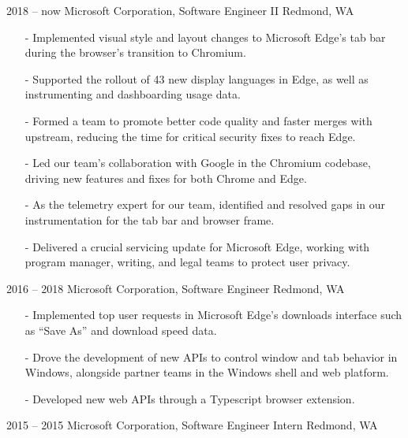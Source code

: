 \documentclass[print]{template/friggeri-cv}
\begin{document}
    \begin{entrylist}
        \entry
            {2018 -- now}
            {Microsoft Corporation, {\normalfont Software Engineer II}}
            {Redmond, WA}
            {\vspace{6pt} \begin{itemize}[leftmargin=*,itemsep=4pt]
                \item[-] Implemented visual style and layout changes to Microsoft Edge's tab bar during the browser's transition to Chromium.
                \item[-] Supported the rollout of 43 new display languages in Edge, as well as instrumenting and dashboarding usage data.
                \item[-] Formed a team to promote better code quality and faster merges with upstream, reducing the time for critical security fixes to reach Edge.
                \item[-] Led our team's collaboration with Google in the Chromium codebase, driving new features and fixes for both Chrome and Edge.
                \item[-] As the telemetry expert for our team, identified and resolved gaps in our instrumentation for the tab bar and browser frame.
                \item[-] Delivered a crucial servicing update for Microsoft Edge, working with program manager, writing, and legal teams to protect user privacy.
             \end{itemize}}
        \entry
            {2016 -- 2018}
            {Microsoft Corporation, {\normalfont Software Engineer}}
            {Redmond, WA}
            {\vspace{6pt} \begin{itemize}[leftmargin=*,itemsep=4pt]
                \item[-] Implemented top user requests in Microsoft Edge's downloads interface such as ``Save As'' and download speed data.
                \item[-] Drove the development of new APIs to control window and tab behavior in Windows, alongside partner teams in the Windows shell and web platform.
                \item[-] Developed new web APIs through a Typescript browser extension.
             \end{itemize}}
        \entry
            {2015 -- 2015}
            {Microsoft Corporation, {\normalfont Software Engineer Intern}}
            {Redmond, WA}
            {\vspace{6pt} \begin{itemize}[leftmargin=*,itemsep=4pt]

\end{itemize}}
\end{entrylist}
\end{document}
